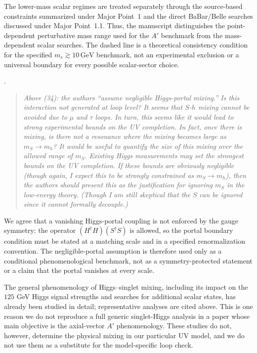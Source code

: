 \documentclass[12pt,a4paper]{article}
\begin{document}
The lower-mass scalar regimes are treated separately through the source-based constraints summarized under Major Point~1 and the direct BaBar/Belle searches discussed under Major Point~1.1. Thus, the manuscript distinguishes the point-dependent perturbative mass range used for the \(A'\) benchmark from the mass-dependent scalar searches. The dashed line is a theoretical consistency condition for the specified \(m_s\gtrsim10\,\mathrm{GeV}\) benchmark, not an experimental exclusion or a universal boundary for every possible scalar-sector choice.

\medskip
{}. \begin{quote}\itshape
Above (34): the authors ``assume negligible Higgs-portal mixing.'' Is this interaction not generated at loop level? It seems that \(S\)-\(h\) mixing cannot be avoided due to \(\mu\) and \(\tau\) loops. In turn, this seems like it would lead to strong experimental bounds on the UV completion. In fact, once there is mixing, is there not a resonance where the mixing becomes large as \(m_S\to m_h\)? It would be useful to quantify the size of this mixing over the allowed range of \(m_S\). Existing Higgs measurements may set the strongest bounds on the UV completion. If these bounds are obviously negligible (though again, I expect this to be strongly constrained as \(m_S\to m_h\)), then the authors should present this as the justification for ignoring \(m_S\) in the low-energy theory. (Though I am still skeptical that the \(S\) can be ignored since it cannot formally decouple.)\end{quote}

We agree that a vanishing Higgs-portal coupling is not enforced by the gauge symmetry: the operator \((H^\dagger H)(S^\dagger S)\) is allowed, so the portal boundary condition must be stated at a matching scale and in a specified renormalization convention. The negligible-portal assumption is therefore used only as a conditional phenomenological benchmark, not as a symmetry-protected statement or a claim that the portal vanishes at every scale.

The general phenomenology of Higgs--singlet mixing, including its impact on the \(125\) GeV Higgs signal strengths and searches for additional scalar states, has already been studied in detail; representative analyses are cited above. This is one reason we do not reproduce a full generic singlet-Higgs analysis in a paper whose main objective is the axial-vector \(A'\) phenomenology. These studies do not, however, determine the physical mixing in our particular UV model, and we do not use them as a substitute for the model-specific loop check.
\end{document}
